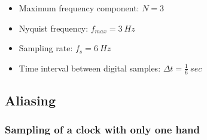 \documentclass[11pt]{article}
\begin{document}
\begin{itemize}
\item Maximum frequency component: \(N = 3\)
\item Nyquist frequency: \(f_{max} = \qty{3}{Hz}\)
\item Sampling rate: \(f_s = \qty{6}{Hz}\)
\item Time interval between digital samples: \(\Delta t = \frac{1}{6} \ \unit{sec}\)
\end{itemize}
\subsection{Aliasing}
\label{sec:org33dd418}

\subsubsection{Sampling of a clock with only one hand}
\label{sec:org8beb9df}
\end{document}

